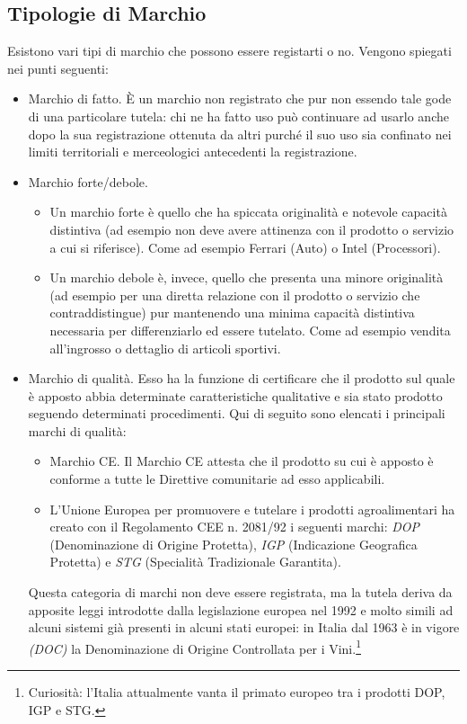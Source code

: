 \subsection{Tipologie di Marchio}
Esistono vari tipi di marchio che possono essere registarti o no. Vengono spiegati nei punti seguenti:
\begin{itemize}
 \item Marchio di fatto. \`E un marchio non registrato che pur non essendo tale gode di una particolare tutela: chi ne ha fatto uso può continuare ad usarlo anche dopo la sua registrazione ottenuta da altri purché il suo uso sia confinato nei limiti territoriali e merceologici antecedenti la registrazione.
 \item Marchio forte/debole.
	\begin{itemize}
	 \item Un marchio forte è quello che ha spiccata originalità e notevole capacità distintiva (ad esempio non deve avere attinenza con il prodotto o servizio a cui si riferisce). Come ad esempio Ferrari (Auto) o Intel (Processori).
	\item Un marchio debole è, invece, quello che presenta una minore originalità (ad esempio per una diretta relazione con il prodotto o servizio che contraddistingue) pur mantenendo una minima capacità distintiva necessaria per differenziarlo ed essere tutelato. Come ad esempio vendita all'ingrosso o dettaglio di articoli sportivi.
	\end{itemize} 

\item Marchio di qualità. Esso ha la funzione di certificare che il prodotto sul quale è apposto abbia determinate caratteristiche qualitative e sia stato prodotto seguendo determinati procedimenti. Qui di seguito sono elencati i principali marchi di qualità:

	\begin{itemize}
	\item Marchio CE. Il Marchio CE attesta che il prodotto su cui è apposto è conforme a tutte le Direttive comunitarie ad esso applicabili.
	\item L'Unione Europea per promuovere e tutelare i prodotti agroalimentari ha creato con il Regolamento CEE n. 2081/92 i seguenti marchi: \textit{DOP} (Denominazione di Origine Protetta), \textit{IGP} (Indicazione Geografica Protetta) e \textit{STG} (Specialità Tradizionale Garantita).
	\end{itemize}

Questa categoria di marchi non deve essere registrata, ma la tutela deriva da apposite leggi introdotte dalla legislazione europea nel 1992 e molto simili ad alcuni sistemi già presenti in alcuni stati europei: in Italia dal 1963 è in vigore \textit{(DOC)} la Denominazione di Origine Controllata per i Vini.\footnote{Curiosità: l'Italia attualmente vanta il primato europeo tra i prodotti DOP, IGP e STG.}



\end{itemize}

